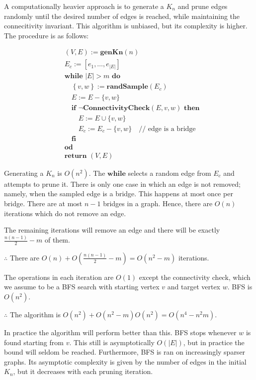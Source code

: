 \documentclass[11pt,a4paper]{article}
\begin{document}
A computationally heavier approach is to generate a $K_n$ and prune edges
randomly until the desired number of edges is reached, while maintaining the 
connecitivity invariant. This algorithm is unbiased, but its complexity is
higher. The procedure is as follows:

\[
\begin{aligned}
&(V, E) := \textbf{genKn}(n)\\
&E_c := [e_1, \ldots, e_{|E|}]\\
&\textbf{while } |E| > m  \textbf{ do}\\
&\quad \left\{ v, w \right\}  := \textbf{randSample}(E_c)\\
&\quad E := E - \{v, w\}\\[4pt]
&\quad \textbf{if } \neg \textbf{ConnectivityCheck}(E, v, w) \textbf{ then}\\
&\quad\quad E := E \cup \{v, w\}\\
&\quad\quad E_c := E_c - \{v, w\} \quad \text{// edge is a bridge}\\
&\quad \textbf{fi}\\
&\textbf{od}\\[4pt]
&\textbf{return } (V, E)
\end{aligned}
\]

Generating a $K_n$ is $O(n^2)$. The $\textbf{while}$ selects a random edge
from $E_c$ and attempts to prune it. There is only one case in
which an edge is not removed; namely, when the sampled edge is a bridge. This
happens at most once per bridge. There are at most $n - 1$ bridges in a graph.
Hence, there are $O(n)$ iterations which do not remove an edge.

The remaining iterations will remove an edge and there will be exactly
$\frac{n(n-1)}{2} - m$ of them.

$\therefore$ There are $O(n) + O(\frac{n(n-1)}{2} - m) = O(n^2 - m)$
iterations.

The operations in each iteration are $O(1)$ except the connectivity check, which
we assume to be a BFS search with starting vertex $v$ and target vertex $w$. BFS
is $O(n^2)$.

$\therefore$ The algorithm is $O(n^2) + O(n^2 - m)O(n^2) = O(n^4 - n^2m)$.

In practice the algorithm will perform better than this. BFS stops whenever $w$
is found starting from $v$. This still is asymptotically $O(|E|)$, but in
practice the bound will seldom be reached. Furthermore, BFS is ran on
increasingly sparser graphs. Its asymptotic complexity is given by the number of
edges in the initial $K_n$, but it decreases with each pruning iteration.
\end{document}

